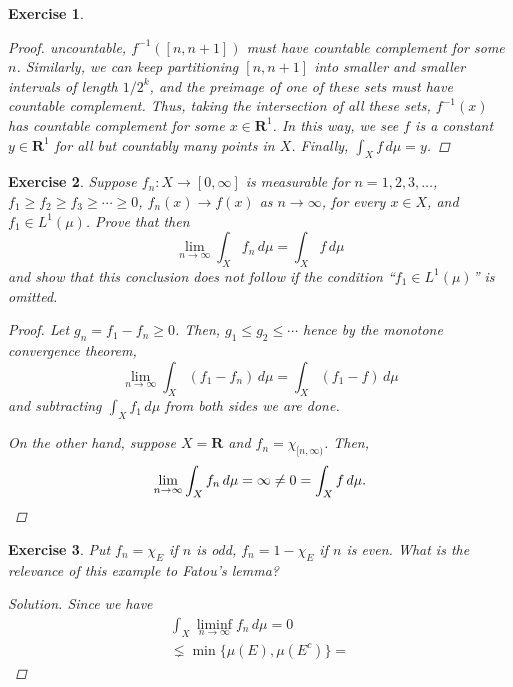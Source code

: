 \documentclass[10pt,letterpaper]{amsart}
\newtheorem{exercise}{Exercise}[section]
\theoremstyle{definition}
\theoremstyle{remark}
\numberwithin{equation}{exercise}
\begin{document}
\begin{multicols}{2}
\begin{exercise}
\begin{proof}
      uncountable, $f^{-1}([n,n+1])$ must have countable complement for some
      $n$. Similarly, we can keep partitioning $[n,n+1]$ into smaller and
      smaller intervals of length $1/2^k$, and the preimage of one of these sets
      must have countable complement. Thus, taking the intersection of all these
      sets, $f^{-1}(x)$ has countable complement for some $x \in \mathbf{R}^1$.
      In this way, we see $f$ is a constant $y \in \mathbf{R}^1$ for all but
      countably many points in $X$. Finally, $\int_X f\,d\mu = y$.
    \end{proof}
  \end{exercise}
  \begin{exercise}
    Suppose $f_n \colon X \to [0,\infty]$ is measurable for $n = 1,2,3,\ldots$,
    $f_1 \ge f_2 \ge f_3 \ge \cdots \ge 0$, $f_n(x) \to f(x)$ as $n \to \infty$,
    for every $x \in X$, and $f_1 \in L^1(\mu)$. Prove that then
    \begin{equation*}
      \lim_{n \to \infty} \int_X f_n\,d\mu = \int_X f\,d\mu
    \end{equation*}
    and show that this conclusion does \emph{not} follow if the condition ``$f_1
    \in L^1(\mu)$'' is omitted.
    \begin{proof}
      Let $g_n = f_1 - f_n \ge 0$. Then, $g_1 \le g_2 \le \cdots$ hence by the
      monotone convergence theorem,
      \begin{equation*}
        \lim_{n \to \infty} \int_X (f_1 - f_n)\,d\mu = \int_X (f_1 - f)\,d\mu
      \end{equation*}
      and subtracting $\int_X f_1\,d\mu$ from both sides we are done.
      \par On the other hand, suppose $X = \mathbf{R}$ and $f_n =
      \chi_{[n,\infty)}$. Then,
      \begin{equation*}
        \lim_{n \to \infty} \int_X f_n\,d\mu = \infty \ne 0 = \int_X
        f\,d\mu.\qedhere
      \end{equation*}
    \end{proof}
  \end{exercise}
  \begin{exercise}
    Put $f_n = \chi_E$ if $n$ is odd, $f_n = 1 - \chi_E$ if $n$ is even. What is
    the relevance of this example to Fatou's lemma?
    \begin{proof}[Solution]
      Since we have
      \begin{multline*}
        \int_X \liminf_{n \to \infty} f_n\,d\mu = 0\\
        \lneq \min\{\mu(E),\mu(E^c)\} = 

\end{multline*}
\end{proof}
\end{exercise}
\end{multicols}
\end{document}
